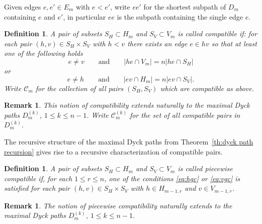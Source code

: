 \documentclass{amsart}
\newtheorem{definition}[theorem]{Definition}
\newtheorem{remark}[theorem]{Remark}
\numberwithin{equation}{section}
\newcommand{\cC}{\mathcal{C}}
\begin{document}
Given edges $e,e'\in E_m$ with $e<e'$, write $ee'$ for the shortest subpath of $D_m$ containing $e$ and $e'$, in particular $ee$ is the subpath containing the single edge $e$.
\begin{definition}
  \label{def:compatibility}
  A pair of subsets $S_H\subset H_m$ and $S_V\subset V_m$ is called \emph{compatible} if: 
  for each pair $(h,v)\in S_H\times S_V$ with $h<v$ there exists an edge $e\in hv$ so that at least one of the following holds
  \begin{equation}
    \label{eq:hgc}
    e\ne v\qquad\text{and}\qquad |he\cap V_m|=n|he\cap S_H|
  \end{equation}
  or
  \begin{equation}
    \label{eq:vgc}
    e\ne h\qquad\text{and}\qquad |ev\cap H_m|=n|ev\cap S_V|.
  \end{equation}
  Write $\cC_m$ for the collection of all pairs $(S_H,S_V)$ which are compatible as above.
\end{definition}
\begin{remark}
  This notion of compatibility extends naturally to the maximal Dyck paths $D_m^{(k)}$, $1\le k\le n-1$.  Write $\cC_m^{(k)}$ for the set of all compatible pairs in $D_m^{(k)}$.
\end{remark}

The recursive structure of the maximal Dyck paths from Theorem~\ref{th:dyck path recursion} gives rise to a recursive characterization of compatible pairs.
\begin{definition}
  \cite[Definition 3.11]{rupel}
  \label{def:piecewise compatibility}
  A pair of subsets $S_H\subset H_m$ and $S_V\subset V_m$ is called \emph{piecewise compatible} if, for each $1\le r\le n$, one of the conditions \eqref{eq:hgc} or \eqref{eq:vgc} is satisfied for each pair $(h,v)\in S_H\times S_V$ with $h\in H_{m-1,r}$ and $v\in V_{m-1,r}$.
\end{definition}
\begin{remark}
  The notion of piecewise compatibility naturally extends to the maximal Dyck paths $D_m^{(k)}$, $1\le k\le n-1$.
\end{remark}
\end{document}
